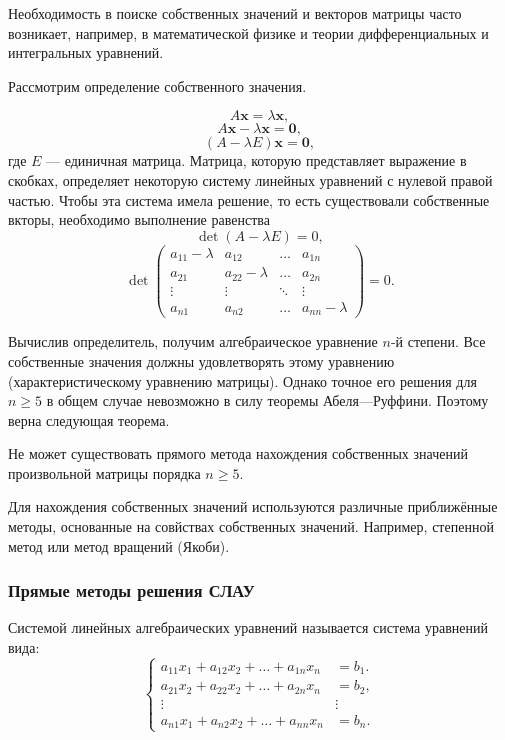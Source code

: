 Необходимость в поиске собственных значений и векторов матрицы часто
возникает, например, в математической физике и теории дифференциальных
и интегральных уравнений.

Рассмотрим определение собственного значения.

\[
A\mathbf{x}=\lambda\mathbf{x},
\]
\[
A\mathbf{x}-\lambda\mathbf{x}=\mathbf{0},
\]
\[
(A-\lambda E)\mathbf{x}=\mathbf{0},
\]
где $E$ — единичная матрица. Матрица, которую представляет выражение
в скобках, определяет некоторую систему линейных уравнений с нулевой
правой частью. Чтобы эта система имела решение, то есть существовали
собственные вкторы, необходимо выполнение равенства
\[
\det(A-\lambda E)=0,
\]
\[
\det\begin{pmatrix}a_{11}-\lambda & a_{12} & \dots & a_{1n}\\
a_{21} & a_{22}-\lambda & \dots & a_{2n}\\
\vdots & \vdots & \ddots & \vdots\\
a_{n1} & a_{n2} & \ldots & a_{nn}-\lambda
\end{pmatrix}=0.
\]


Вычислив определитель, получим алгебраическое уравнение $n$-й степени.
Все собственные значения должны удовлетворять этому уравнению (характеристическому
уравнению матрицы). Однако точное его решения для $n\geqslant5$ в
общем случае невозможно в силу теоремы Абеля—Руффини. Поэтому верна
следующая теорема.
\begin{thm}
Не может существовать прямого метода нахождения собственных значений
произвольной матрицы порядка $n\geqslant5$.
\end{thm}
Для нахождения собственных значений используются различные приближённые
методы, основанные на совйствах собственных значений. Например, степенной
метод или метод вращений (Якоби).


\subsubsection{Прямые методы решения СЛАУ}

Системой линейных алгебраических уравнений называется система уравнений
вида:
\[
\begin{cases}
a_{11}x_{1}+a_{12}x_{2}+\ldots+a_{1n}x_{n} & =b_{1}.\\
a_{21}x_{2}+a_{22}x_{2}+\ldots+a_{2n}x_{n} & =b_{2},\\
\vdots & \vdots\\
a_{n1}x_{1}+a_{n2}x_{2}+\ldots+a_{nn}x_{n} & =b_{n}.
\end{cases}
\]


